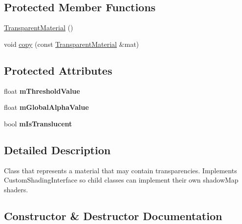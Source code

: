 \subsection*{Protected Member Functions}
\begin{DoxyCompactItemize}
\item 
\mbox{\hyperlink{class_geometry_engine_1_1_geometry_material_1_1_transparent_material_ac27f7c3f5604b030abbbfc21cbe31890}{Transparent\+Material}} ()
\item 
void \mbox{\hyperlink{class_geometry_engine_1_1_geometry_material_1_1_transparent_material_a89eaec3ce50fbca5e56edcbe3f3cde6f}{copy}} (const \mbox{\hyperlink{class_geometry_engine_1_1_geometry_material_1_1_transparent_material}{Transparent\+Material}} \&mat)
\end{DoxyCompactItemize}
\subsection*{Protected Attributes}
\begin{DoxyCompactItemize}
\item 
\mbox{\label{class_geometry_engine_1_1_geometry_material_1_1_transparent_material_ad7182a65cc6564b203248f890a165c1d}} 
float {\bfseries m\+Threshold\+Value}
\item 
\mbox{\label{class_geometry_engine_1_1_geometry_material_1_1_transparent_material_a6ad3ebcd85fddb914e1613149cf5bdc2}} 
float {\bfseries m\+Global\+Alpha\+Value}
\item 
\mbox{\label{class_geometry_engine_1_1_geometry_material_1_1_transparent_material_acb52de4a47e810e1f25f267742067c53}} 
bool {\bfseries m\+Is\+Translucent}
\end{DoxyCompactItemize}


\subsection{Detailed Description}
Class that represents a material that may contain transparencies. Implements Custom\+Shading\+Interface so child classes can implement their own shadow\+Map shaders. 

\subsection{Constructor \& Destructor Documentation}
\mbox{\label{class_geometry_engine_1_1_geometry_material_1_1_transparent_material_af6792dc3a5911bdb3ee803d5a129088a}} 
